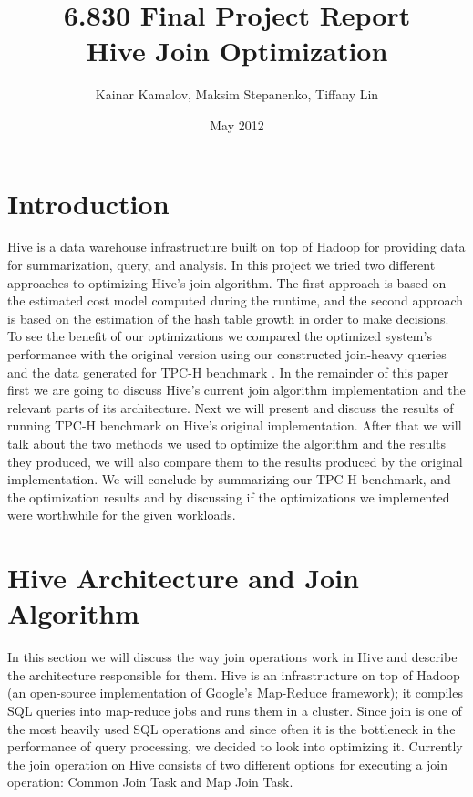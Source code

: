 \documentclass[11 pt ]{article}
\title{6.830 Final Project Report \\ Hive Join Optimization}
\author{Kainar Kamalov, Maksim Stepanenko, Tiffany Lin}
\date{May 2012}
\begin{document}
\setlength{\baselineskip}{1.3\baselineskip}

\ifpdf
{}
\else
{}
\fi

\maketitle

\section{Introduction}
Hive is a data warehouse infrastructure built on top of Hadoop for providing data for summarization, query, and analysis. In this project we tried two different approaches to optimizing Hive's join algorithm. The first approach is based on the estimated cost model computed during the runtime, and the second approach is based on the estimation of the hash table growth in order to make decisions. To see the benefit of our optimizations we compared the optimized system's performance with the original version using our constructed join-heavy queries and the data generated for TPC-H benchmark \cite{tpc-h}. In the remainder of this paper first we are going to discuss Hive's current join algorithm implementation and the relevant parts of its architecture. Next we will present and discuss the results of running TPC-H benchmark on Hive's original implementation. After that we will talk about the two methods we used to optimize the algorithm and the results they produced, we will also compare them to the results produced by the original implementation. We will conclude by summarizing our TPC-H benchmark, and the optimization results and by discussing if the optimizations we implemented were worthwhile for the given workloads.
\section{Hive Architecture and Join Algorithm}
In this section we will discuss the way join operations work in Hive and describe the architecture responsible for them. Hive is an infrastructure on top of Hadoop (an open-source implementation of Google's Map-Reduce framework); it compiles SQL queries into map-reduce jobs and runs them in a cluster. Since join is one of the most heavily used SQL operations and since often it is the bottleneck in the performance of query processing, we decided to look into optimizing it. Currently the join operation on Hive consists of two different options for executing a join operation: Common Join Task and Map Join Task. 
\end{document}
